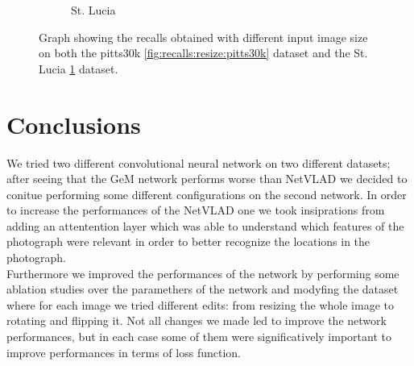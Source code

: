\documentclass[10pt,twocolumn,letterpaper]{article}
\begin{document}
\begin{figure}[!h]
\begin{subfigure}[b]{0.23\textwidth}
		\caption{St. Lucia}
		\label{fig:recalls:resize:st_lucia}
	\end{subfigure}
	\caption{Graph showing the recalls obtained with different input image size on both the pitts30k \ref{fig:recalls:resize:pitts30k} dataset and the St. Lucia \ref{fig:recalls:resize:st_lucia} dataset.}
	\label{fig:recalls:resize}
\end{figure}

\section{Conclusions}
We tried  two different convolutional neural network on two different datasets; after seeing that the GeM network performs worse than NetVLAD
we decided to conitue performing some different configurations on the second network. In order to increase the performances of the NetVLAD one
we took insiprations from \cite{CRN} adding an attentention layer which was able to understand which features of the photograph were relevant in order
to better recognize the locations in the photograph.\\
Furthermore we improved the performances of the network by performing some ablation studies over the paramethers of the network and modyfing 
the dataset where for each image we tried different edits: from resizing the whole image to rotating and flipping it. Not all changes we made
led to improve the network performances, but in each case some of them were significatively important to improve performances in terms of 
loss function.
{\small
	
	
}
	
\end{document}
